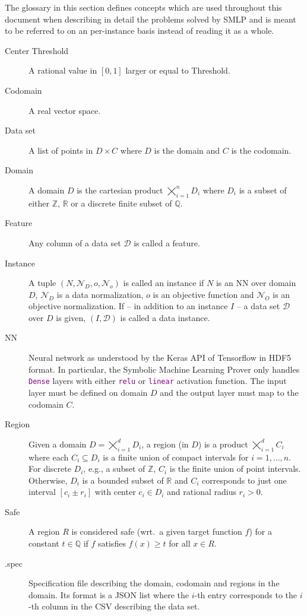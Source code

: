 \documentclass[a4paper,parskip=half]{article} %
\newcommand*\cmdstyle\texttt
\newcommand*\api[1]{\textcolor{purple}{\cmdstyle{#1}}}
\newcommand*\Solver{Symbolic Machine Learning Prover\xspace}
\newcommand*\SolverAbbrvText{SMLP}
\newcommand*\SolverAbbrv{\SolverAbbrvText\xspace}
\begin{document}
The glossary in this section defines concepts which are used throughout this
document when describing in detail the problems solved by \SolverAbbrv and is
meant to be referred to on an per-instance basis instead of reading it as a
whole.
\begin{description}
\item[Center Threshold]
	A rational value in $[0,1]$ larger or equal to Threshold.
\item[Codomain]
	A real vector space.
\item[Data set]
	A list of points in $D\times C$ where $D$ is the domain and $C$ is the
	codomain.
\item[Domain]
	A domain $D$ is the cartesian product $\bigtimes_{i=1}^n D_i$ where
	$D_i$ is a subset of either $\mathbb Z$, $\mathbb R$ or a
	discrete finite subset of $\mathbb Q$.
\item[Feature]
	Any column of a data set $\mathcal D$ is called a feature.
\item[Instance]
	A tuple
	$(N,\mathcal N_D,o,\mathcal N_o)$ is called an instance if
	$N$ is an NN over domain $D$, $\mathcal N_D$ is a data normalization,
	$o$ is an objective function and
	$\mathcal N_O$ is an objective normalization.
	If -- in addition to an instance $I$ -- a data set $\mathcal D$ over $D$
	is given, $(I,\mathcal D)$ is called a data instance.
\item[NN]
	Neural network as understood by the Keras API of Tensorflow in HDF5
	format.
	In particular, the \Solver only handles \api{Dense} layers with either
	\api{relu} or \api{linear} activation function.
	The input layer must be defined on domain $D$ and the output layer
	must map to the codomain $C$.
\item[Region]
	Given a domain $D=\bigtimes_{i=1}^d D_i$, a region (in $D$) is a
	product $\bigtimes_{i=1}^d C_i$ where
	each $C_i\subseteq D_i$ is a finite union of compact intervals for
	$i=1,\ldots,n$.
	For discrete $D_i$, e.g., a subset of $\mathbb Z$,
	$C_i$ is the finite union of point intervals.
	Otherwise, $D_i$ is a bounded subset of $\mathbb R$ and $C_i$
	corresponds to just one interval $[c_i\pm r_i]$ with center $c_i\in D_i$
	and rational radius $r_i>0$.
\item[Safe]
	A region $R$ is considered safe (wrt.\ a given target function $f$) for a
	constant $t\in\mathbb Q$ if $f$ satisfies $f(x)\geq t$
	for all $x\in R$.
\item[.spec]
	Specification file describing the domain, codomain and regions in the
	domain. Its format is a JSON list where the $i$-th entry corresponds to
	the $i$-th column in the CSV describing the data set.


\end{description}
\end{document}
